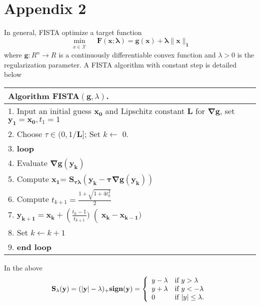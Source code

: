 \documentclass[12pt]{article}
\begin{document}
\section*{Appendix 2}
\label{sec:appendix2}
In general, FISTA optimize a target function
\begin{equation}\label{eqn: fistatarget}
\min_{\substack{x\in \mathcal{X}}}\quad \mathbf{F(x;\lambda)} = \mathbf{g(x)}+ \mathbf{\lambda \|x\|_1}
\end{equation}
where $\mathbf{g}: R^n \rightarrow R $ is a continuously differentiable convex function and $\lambda > 0$ is the regularization parameter. A FISTA algorithm with constant step is detailed below\\

\begin{tabular}{l}
\hline
\textbf{Algorithm } FISTA$(\mathbf{g},\lambda)$.\\
\hline
 1. Input an initial guess $\mathbf{x_0}$ and Lipschitz constant $\mathbf{L}$ for $\mathbf{\nabla g}$, set $\mathbf{y_1} = \mathbf{x_0},t_1 = 1$\\
 2. Choose $\tau \in (0,1/\mathbf{L}]$; Set $k \leftarrow$ 0.\\
 3. \textbf{loop}\\
 4. \hspace{10mm}		Evaluate $\mathbf{\nabla g(y_k)}$\\
 5.	\hspace{10mm}	Compute $\mathbf{x_{1}}$= $\mathbf{S_{\tau\lambda}(y_k - \tau\nabla g(y_k))}$\\
 6.	\hspace{10mm}	Compute $t_{k+1} = \frac{1+\sqrt{1 + 4 t_k^2}}{2}$\\
 7.	\hspace{10mm}	$\mathbf{y_{k+1}} = \mathbf{x_k} + \left(\frac{t_k - 1}{t_{k+1}})\right (\mathbf{x_k}-\mathbf{x_{k-1}})$\\
 8.	\hspace{10mm}	Set $k \leftarrow k+1$ \\
 9. \textbf{end loop}\\
\hline
\end{tabular}


\vspace*{10mm}
In the above
\[
\mathbf{S_\lambda (y) = (|y|-\lambda)_{+}\textbf{sign}(y)}=\left\{
\begin{array}{l l }
 y - \lambda & \text{if   } y > \lambda\\
 y + \lambda & \text{if   } y < -\lambda\\
 0 & \text{if   } |y| \leq \lambda .
\end{array}
\right.
\]
\end{document}
